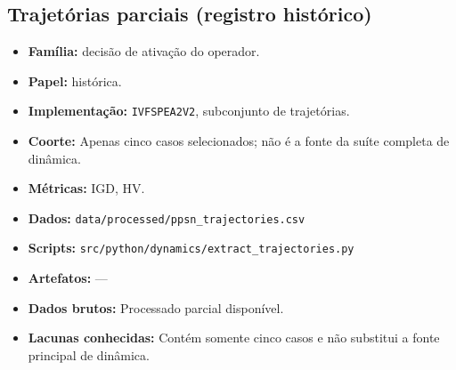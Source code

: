 \subsection*{Trajetórias parciais (registro histórico)}
\begin{itemize}[nosep]\raggedright
    \item \textbf{Família:} decisão de ativação do operador.
    \item \textbf{Papel:} histórica.
    \item \textbf{Implementação:} \texttt{IVFSPEA2V2}, subconjunto de trajetórias.
    \item \textbf{Coorte:} Apenas cinco casos selecionados; não é a fonte da suíte completa de dinâmica.
    \item \textbf{Métricas:} IGD, HV.
    \item \textbf{Dados:} \texttt{data/\allowbreak{}processed/\allowbreak{}ppsn\_\allowbreak{}trajectories.csv}
    \item \textbf{Scripts:} \texttt{src/\allowbreak{}python/\allowbreak{}dynamics/\allowbreak{}extract\_\allowbreak{}trajectories.py}
    \item \textbf{Artefatos:} ---
    \item \textbf{Dados brutos:} Processado parcial disponível.
    \item \textbf{Lacunas conhecidas:} Contém somente cinco casos e não substitui a fonte principal de dinâmica.
\end{itemize}

